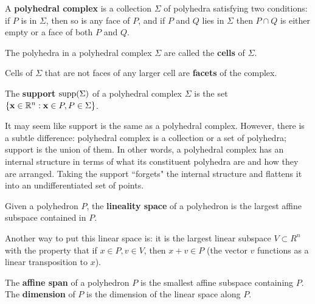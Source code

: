 	\begin{definition}
		A \textbf{polyhedral complex} is a collection $\Sigma$
		of polyhedra satisfying two conditions:
		if $P$ is in $\Sigma$, 
		then so is any face of $P$,
		and if $P$ and $Q$ lies in $\Sigma$ 
		then $P \cap Q$ is either empty or a face of both $P$ and $Q$.
	\end{definition}
	
	\begin{definition}
		The polyhedra in a polyhedral complex $\Sigma$ 
		are called the \textbf{cells} of $\Sigma$. 
	\end{definition}
	
	\begin{definition}[Facets]
		Cells of $\Sigma$ that are not faces of any larger cell are
		\textbf{facets} of the complex.
	\end{definition}
	
	\begin{definition}[Support]
	\label{def:support-of-a-polyhedral-complex}
		The \textbf{support} $\operatorname{supp}(\Sigma)$ of a polyhedral complex 
		$\Sigma$ is the set 
		$\{\mathbf{x} \in \mathbb{R}^n: \mathbf{x} \in P, P \in \Sigma \}$.
	\end{definition}
	
	\begin{remark}
	It may seem like support is the same as a polyhedral complex. 
	However, there is a subtle difference:
	polyhedral complex is a collection or a set of polyhedra;
	support is the union of them. 
	In other words, 
	a polyhedral complex has an internal structure 
	in terms of what its constituent polyhedra are and 
	how they are arranged. 
	Taking the support ``forgets" the internal structure 
	and flattens it into an undifferentiated set of points.
	\end{remark}
	 
	\begin{definition}
	    Given a polyhedron $P$,
		the \textbf{lineality space} 
		of a polyhedron is the largest affine subspace 
		contained in $P$.
	\end{definition}
	Another way to put this linear space is:
	it is the largest linear subspace $V \subset R^n$ 
	with the property that if $x \in P, v \in V$,
	then $x + v \in P$ 
	(the vector $v$ functions as a linear transposition to $x$).
	
	The \textbf{affine span} of a polyhedron $P$ 
	is the smallest affine subspace containing $P$.
	The \textbf{dimension} of $P$ is 
	the dimension of the linear space along $P$.
	
